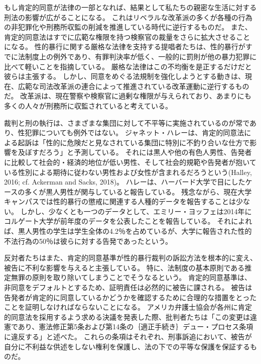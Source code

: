 \documentclass[paper=a4,book,openany]{jlreq}
\newcommand{\ig}[1]{}           %
\begin{document}
もし肯定的同意が法律の一部となれば、結果として私たちの親密な生活に対する刑法の影響が広がることになる。
これはリベラルな改革派の多くが各種の行為の非犯罪化や刑務所収監の削減を推進している時代に逆行するものだ。
また、肯定的同意法はすでに広範な権限を持つ検察官の裁量をさらに拡大させることになる。
性的暴行に関する厳格な法律を支持する提唱者たちは、性的暴行がすでに法制度上の例外であり、有罪判決率が低く、一般的に罰則が他の暴力犯罪に比べて軽いことを指摘している。
厳格な法律はこの不均衡を是正するだけだと彼らは主張する。
しかし、同意をめぐる法規制を強化しようとする動きは、現在、広範な司法改革派の連合によって推進されている改革運動に逆行するものだ。
改革派は、現在警察や検察官に過剰な権限が与えられており、あまりにも多くの人々が刑務所に収監されていると考えている。

裁判と刑の執行は、さまざまな集団に対して不平等に実施されているのが常であり、性犯罪についても例外ではない。
ジャネット・ハレー\ig{Janet Halley}は、肯定的同意法による起訴は「性的に危険だと見なされている集団に特別に不釣り合いな仕方で影響を及ぼすだろう」と予測している。
それには黒人や他の有色人男性、告発者に比較して社会的・経済的地位が低い男性、そして社会的規範や告発者が抱いている性別による期待に従わない男性および女性が含まれるだろうという(Halley, 2016; cf. Ackerman and Sacks, 2018)\nocite{ackerman18:_dispr_minor_presen_u}。
ハレーは、ハーバード大学で目にしたケースの多くが黒人男性が関与していると報告している\citep[cf.][]{halley15:_tradin_megap_gavel_title_ix_enfor}。
残念ながら、現在大学キャンパスでは性的暴行の懲戒に関連する人種的データを報告することは少ない。
しかし、少なくとも一つのデータとして、エミリー・ヨッフェ\ig{Emily Yoffe}は2014年にコルゲート大学が前年度のデータを公表したことを報告している。
それによれば、黒人男性の学生は学生全体の4.2％を占めているが、大学に報告された性的不法行為の50％は彼らに対する告発であったという\citep{yoffe17:_quest_race_campus_sexual_assaul_cases}。

反対者たちはまた、肯定的同意基準が性的暴行裁判の訴訟方法を根本的に変え、被告に不利な影響を与えると主張している。
特に、法制度の基本原則である推定無罪の原則を取り除いてしまうことでそうなるという。
肯定的同意基準は、非同意をデフォルトとするため、証明責任は必然的に被告に課される。
被告は告発者が肯定的に同意しているかどうかを確認するために合理的な措置をとったことを証明しなければならないことになる。
アメリカ弁護士協会が各州に肯定的同意法を採用するよう求める決議を発表した際、批判者たちは「この変更は違憲であり、憲法修正第5条および第14条の｛適正手続き｝{デュー・プロセス}条項に違反する」と述べた。
これらの条項はそれぞれ、刑事訴追において、被告が自分に不利益な供述をしない権利を保護し、法の下での平等な保護を保証するものだ\citep{bauer-wolf19:_lawyer_group_disag_colleg_model_affir_consen}。
\end{document}
